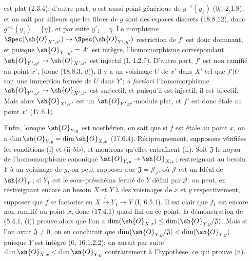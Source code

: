 est plat (2.3.4); d'autre part, $\eta$ est aussi point générique de $g^{-1}(y_1)$ ($0_{\mathrm I}$, 2.1.8), et on sait par ailleurs que les fibres de $g$ sont des espaces discrets (18.8.12), donc $g^{-1}(y_1)=\{\eta\}$, et par suite $y'_1=\eta$. Le morphisme $\Spec(\sh{O}_{X',x'})\to\Spec(\sh{O}_{Y',y'})$ restriction de $f'$ est donc dominant, et puisque $\sh{O}_{Y',y'}=A'$ est intègre, l'homomorphisme correspondant $\sh{O}_{Y',y'}\to\sh{O}_{X',x'}$ est injectif (I, 1.2.7). D'autre part, $f'$ est non ramifié au point $x'$, (donc (18.8.3, $d$)), il y a un voisinage $U$ de $x'$ dans $X'$ tel que $f'|U$ soit une immersion fermée de $U$ dans $Y'$; \emph{a fortiori} l'homomorphisme $\sh{O}_{Y',y'}\to\sh{O}_{X',x'}$ est surjectif, et puisqu'il est injectif, il est bijectif. Mais alors $\sh{O}_{X',x'}$ est un $\sh{O}_{Y',y'}$-module plat, et $f'$ est donc étale au point $x'$ (17.6.1).

Enfin, lorsque $\sh{O}_{Y,y}$ est noethérien, on sait que si $f$ est étale au point $x$, on a $\dim\sh{O}_{Y,y}=\dim\sh{O}_{X,x}$ (17.6.4). Réciproquement, supposons vérifiées les conditions (i) et (ii \emph{bis}), et montrons qu'elles entraînent (ii). Soit $\mathfrak J$ le noyau de l'homomorphisme canonique $\sh{O}_{Y,y}\to\sh{O}_{X,x}$; restreignant au besoin $Y$ à un voisinage de $y$, on peut supposer que $\mathfrak J=\mathscr{J}_y$, où $\mathscr{J}$ est un Idéal de $\sh{O}_Y$; si $Y_1$ est le sous-préschéma fermé de $Y$ défini par $\mathscr{J}$, on peut, en restreignant encore au besoin $X$ et $Y$ à des voisinages de $x$ et $y$ respectivement, supposer que $f$ se factorise en $X\xrightarrow{f_1}Y_1\to Y$ (I, 6.5.1). Il est clair que $f_1$ est encore non ramifié au point $x$, donc (17.4.1) quasi-fini en ce point; la démonstration de (5.4.1, (i)) prouve alors que l'on a $\dim(\sh{O}_{X,x})\leq\dim(\sh{O}_{Y,y}/\mathfrak J)$. Mais si l'on avait $\mathfrak J\neq0$, on en conclurait que $\dim(\sh{O}_{Y,y}/\mathfrak J)<\dim(\sh{O}_{Y,y})$ puisque $Y$ est intègre ($0$, 16.1.2.2); on aurait par suite $\dim\sh{O}_{X,x}<\dim\sh{O}_{Y,y}$ contrairement à l'hypothèse, ce qui prouve (ii).

